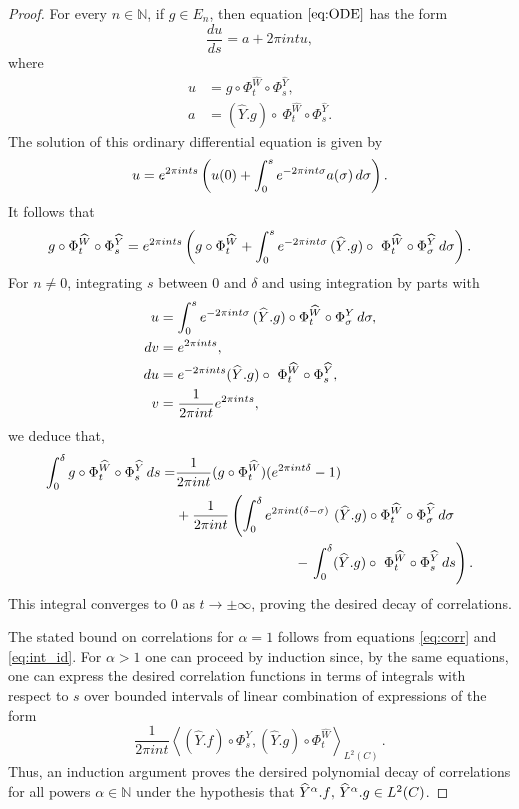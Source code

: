 \documentclass{amsart}
\theoremstyle{definition}
\theoremstyle{remark}
\numberwithin{equation}{section}
\newcommand{\wY}{\widehat{Y}}
\newcommand{\wW}{\widehat{W}}
\newcommand{\<}{{\langle}}
\renewcommand{\>}{{\rangle}}
\newcommand{\field}[1]{\mathbb{#1}}
\newcommand{\N}{\field{N}}
\begin{document}
\begin{proof}
For every $n \in \mathbb{N}$, if $g \in E_n$, then equation $\eqref{eq:ODE}$ has the form
\[
\frac{du}{ds} = a + 2\pi i n t u,
\]
where
\begin{align*}
    u &= g \circ \Phi_t^{\wW} \circ \Phi_s^{\wY}, \\
    a &= (\widehat{Y}.g) \circ\ \Phi_t^{\wW} \circ \Phi_s^{\wY}.
\end{align*}
The solution of this ordinary differential equation is given by
\[
u = e^{2 \pi i  n t s} \left( u(0) + \int_0^s e^{-2 \pi i n t \sigma} a(\sigma) \thinspace d \sigma \right).
\]
It follows that
\[
g \circ \Phi_t^{\wW} \circ \Phi_s^{\wY} = e^{2 \pi i  n t s} \left( g \circ \Phi_t^{\wW} + \int_0^s e^{-2 \pi i n t \sigma} \thinspace (\widehat{Y}.g) \circ\ \Phi_t^{\wW} \circ \Phi_\sigma^{\wY} \thinspace d \sigma \right).
\]
For $n \neq 0$, integrating $s$ between $0$ and $\delta$ and using integration by parts with
\begin{align*}
u &= \int_0^s e^{-2 \pi i n t \sigma} \thinspace(\widehat{Y}.g) \circ \Phi_t^{\wW} \circ \Phi_\sigma^Y \thinspace d \sigma, \\
dv &= e^{2 \pi i nt s},\\
du &= e^{- 2 \pi i n t s}  (\widehat{Y}.g) \circ\ \Phi_t^{\wW} \circ \Phi_s^{\wY},\\
v &= \frac{1}{2 \pi i n t} e^{2 \pi i n t s},
\end{align*}
we deduce that, 
\begin{align}
    \int_0^\delta g \circ \Phi_t^{\wW} \circ \Phi_s^{\wY} \thinspace ds = &\frac{1}{2 \pi i n t} (g \circ \Phi_t^{\wW})(e^{2 \pi i n t \delta}  
 - 1) \label{eq:int_id} \\
 &+ \frac{1}{2 \pi i n t} \left( \int_0^\delta e^{2 \pi i n t (\delta - \sigma)} \thinspace \thinspace(\widehat{Y}.g) \circ \Phi_t^{\wW} \circ \Phi_\sigma^{\wY} \thinspace d \sigma  \right.  \nonumber\\
 & \hspace{3cm}- \left.\int_0^\delta (\widehat{Y}.g) \circ\ \Phi_t^{\wW} \circ \Phi_s^{\wY} \thinspace ds \right). \nonumber
 \end{align}
This integral converges to $0$ as $t \to \pm \infty$, proving the desired decay of correlations.

The stated bound on correlations for $\alpha=1$ follows from equations \eqref{eq:corr} and \eqref{eq:int_id}.  For $\alpha >1$ one can proceed by induction
since, by the same equations, one can 
express the desired correlation functions
in terms of integrals with respect to $s$ over bounded intervals of linear combination of  expressions of the form 
\[
\frac{1}{2 \pi i n t} \left\langle (\widehat{Y}.f) \circ \Phi_s^Y
, (\widehat{Y}.g) \circ \Phi^{\wW}_t \right\rangle_{L^2(C)} \,.
\]
Thus, an induction argument proves the dersired polynomial decay of
correlations for all powers $\alpha \in \N$ under the hypothesis
that $\smash{\widehat{Y}^\alpha.f}, \thinspace\smash{\widehat{Y}^\alpha.g} \in L^2(C)$.
\end{proof}
\end{document}
